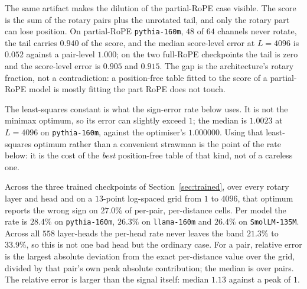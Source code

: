 \documentclass{article}
\theoremstyle{plain}
\theoremstyle{remark}
\begin{document}
The same artifact makes the dilution of the partial-RoPE case visible. The score
is the sum of the rotary pairs plus the unrotated tail, and only the rotary part
can lose position. On partial-RoPE \texttt{pythia-160m}, $48$ of $64$ channels
never rotate, the tail carries $0.940$ of the score, and the median score-level
error at $L=4096$ is $0.052$ against a pair-level $1.000$; on the two full-RoPE
checkpoints the tail is zero and the score-level error is $0.905$ and $0.915$.
The gap is the architecture's rotary fraction, not a contradiction: a
position-free table fitted to the score of a partial-RoPE model is mostly
fitting the part RoPE does not touch.

The least-squares constant is what the sign-error rate below uses. It is not
the minimax optimum, so its error can slightly exceed $1$; the median is
$1.0023$ at $L=4096$ on \texttt{pythia-160m}, against the optimiser's
$1.000000$. Using that least-squares
optimum rather than a convenient strawman is the point of the rate below: it is
the cost of the \emph{best} position-free table of that kind, not of a careless
one.

Across the three trained checkpoints of Section~\ref{sec:trained}, over every
rotary layer and head and on a $13$-point log-spaced grid from $1$ to $4096$,
that optimum reports the wrong sign on $27.0\%$ of per-pair, per-distance cells. Per model the rate is $28.4\%$ on
\texttt{pythia-160m}, $26.3\%$ on \texttt{llama-160m} and $26.4\%$ on
\texttt{SmolLM-135M}. Across all $558$ layer-heads the per-head rate never
leaves the band $21.3\%$ to $33.9\%$, so this is not one bad head but the
ordinary case. For a pair, relative error is the largest absolute deviation from
the exact per-distance value over the grid, divided by that pair's own peak
absolute contribution; the median is over pairs. The relative error is larger
than the signal itself: median $1.13$ against a peak of $1$.
\end{document}
